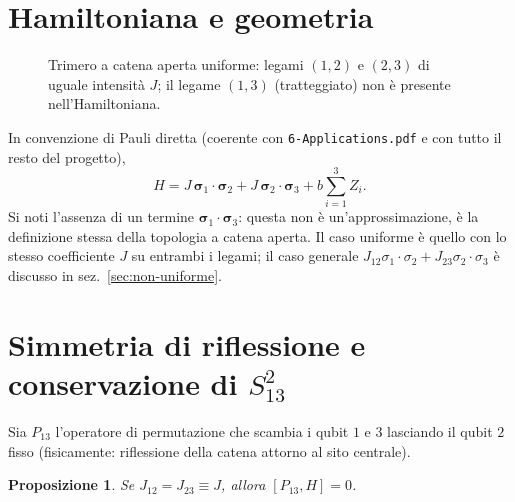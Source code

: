 \documentclass[11pt,a4paper]{article}
\newtheorem{proposizione}{Proposizione}
\begin{document}
\section{Hamiltoniana e geometria}

\begin{figure}[h]
\centering
{}
\caption{Trimero a catena aperta uniforme: legami $(1,2)$ e $(2,3)$ di uguale
intensità $J$; il legame $(1,3)$ (tratteggiato) non è presente
nell'Hamiltoniana.}
\label{fig:geometria}
\end{figure}

In convenzione di Pauli diretta (coerente con \texttt{6-Applications.pdf} e
con tutto il resto del progetto),
\begin{equation}
H = J\,\boldsymbol\sigma_1\cdot\boldsymbol\sigma_2 + J\,\boldsymbol\sigma_2\cdot\boldsymbol\sigma_3
+ b\sum_{i=1}^{3} Z_i .
\label{eq:H}
\end{equation}
Si noti l'assenza di un termine $\boldsymbol\sigma_1\cdot\boldsymbol\sigma_3$: questa non è
un'approssimazione, è la definizione stessa della topologia a catena aperta.
Il caso uniforme è quello con lo stesso coefficiente $J$ su entrambi i
legami; il caso generale $J_{12}\sigma_1\cdot\sigma_2+J_{23}\sigma_2\cdot\sigma_3$
è discusso in sez.~\ref{sec:non-uniforme}.

\section{Simmetria di riflessione e conservazione di $S_{13}^2$}
\label{sec:simmetria}

Sia $P_{13}$ l'operatore di permutazione che scambia i qubit $1$ e $3$
lasciando il qubit $2$ fisso (fisicamente: riflessione della catena
attorno al sito centrale).

\begin{proposizione}
Se $J_{12}=J_{23}\equiv J$, allora $[P_{13},H]=0$.
\end{proposizione}
\end{document}
